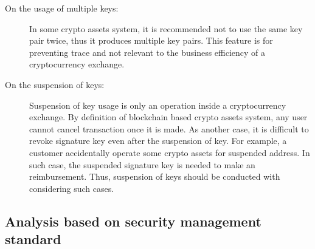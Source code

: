 \begin{description}
 \item[On the usage of multiple keys:]
       In some crypto assets system, it is recommended not to use the same key pair twice, thus it produces multiple key pairs. This feature is for preventing trace and not relevant to the business efficiency of a cryptocurrency exchange.
 \item[On the suspension of keys:]
       Suspension of key usage is only an operation inside a cryptocurrency exchange. By definition of blockchain based crypto assets system, any user cannot cancel transaction once it is made. As another case, it is difficult to revoke signature key even after the suspension of key. For example, a customer accidentally operate some crypto assets for suspended address. In such case, the suspended signature key is needed to make an reimbursement. Thus, suspension of keys should be conducted with considering such cases.
\end{description}


\subsection{Analysis based on security management standard}

